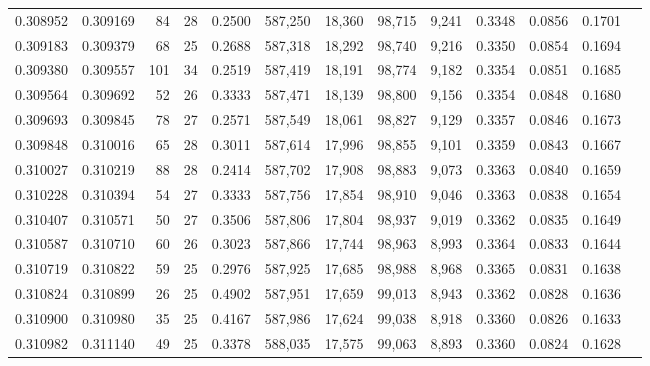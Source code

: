 \begin{tabular}{rrrrrrrrrrrrr}
0.308952 & 0.309169 &  84 &  28 &                                     0.2500 & 587,250 &  18,360 &  98,715 &   9,241 & 0.3348 & 0.0856 & 0.1701 \\
0.309183 & 0.309379 &  68 &  25 &                                     0.2688 & 587,318 &  18,292 &  98,740 &   9,216 & 0.3350 & 0.0854 & 0.1694 \\
0.309380 & 0.309557 & 101 &  34 &                                     0.2519 & 587,419 &  18,191 &  98,774 &   9,182 & 0.3354 & 0.0851 & 0.1685 \\
0.309564 & 0.309692 &  52 &  26 &                                     0.3333 & 587,471 &  18,139 &  98,800 &   9,156 & 0.3354 & 0.0848 & 0.1680 \\
0.309693 & 0.309845 &  78 &  27 &                                     0.2571 & 587,549 &  18,061 &  98,827 &   9,129 & 0.3357 & 0.0846 & 0.1673 \\
0.309848 & 0.310016 &  65 &  28 &                                     0.3011 & 587,614 &  17,996 &  98,855 &   9,101 & 0.3359 & 0.0843 & 0.1667 \\
0.310027 & 0.310219 &  88 &  28 &                                     0.2414 & 587,702 &  17,908 &  98,883 &   9,073 & 0.3363 & 0.0840 & 0.1659 \\
0.310228 & 0.310394 &  54 &  27 &                                     0.3333 & 587,756 &  17,854 &  98,910 &   9,046 & 0.3363 & 0.0838 & 0.1654 \\
0.310407 & 0.310571 &  50 &  27 &                                     0.3506 & 587,806 &  17,804 &  98,937 &   9,019 & 0.3362 & 0.0835 & 0.1649 \\
0.310587 & 0.310710 &  60 &  26 &                                     0.3023 & 587,866 &  17,744 &  98,963 &   8,993 & 0.3364 & 0.0833 & 0.1644 \\
0.310719 & 0.310822 &  59 &  25 &                                     0.2976 & 587,925 &  17,685 &  98,988 &   8,968 & 0.3365 & 0.0831 & 0.1638 \\
0.310824 & 0.310899 &  26 &  25 &                                     0.4902 & 587,951 &  17,659 &  99,013 &   8,943 & 0.3362 & 0.0828 & 0.1636 \\
0.310900 & 0.310980 &  35 &  25 &                                     0.4167 & 587,986 &  17,624 &  99,038 &   8,918 & 0.3360 & 0.0826 & 0.1633 \\
0.310982 & 0.311140 &  49 &  25 &                                     0.3378 & 588,035 &  17,575 &  99,063 &   8,893 & 0.3360 & 0.0824 & 0.1628 \\

\end{tabular}
